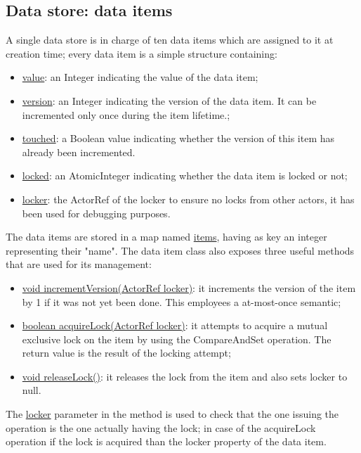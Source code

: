 \subsection{Data store: data items}
A single data store is in charge of ten data items which are assigned to it at creation time; every data item is a simple structure containing:
\begin{itemize}
    \item \url{value}: an Integer indicating the value of the data item;
    \item \url{version}: an Integer indicating the version of the data item. It can be incremented only once during the item lifetime.;
    \item \url{touched}: a Boolean value indicating whether the version of this item has already been incremented.
    \item \url{locked}: an AtomicInteger indicating whether the data item is locked or not;
    \item \url{locker}: the ActorRef of the locker to ensure no locks from other actors, it has been used for debugging purposes.
\end{itemize}
The data items are stored in a map named \url{items}, having as key an integer representing their "name".
The data item class also exposes three useful methods that are used for its management:
\begin{itemize}
    \item \url{void incrementVersion(ActorRef locker)}: it increments the version of the item by 1 if it was not yet been done. This employees a at-most-once semantic;
    \item \url{boolean acquireLock(ActorRef locker)}: it attempts to acquire a mutual exclusive lock on the item by using the CompareAndSet operation. The return value is the result of the locking attempt;
    \item \url{void releaseLock()}: it releases the lock from the item and also sets locker to null.
\end{itemize}
The \url{locker} parameter in the method is used to check that the one issuing the operation is the one actually having the lock; in case of the acquireLock operation if the lock is acquired than the locker property of the data item.

